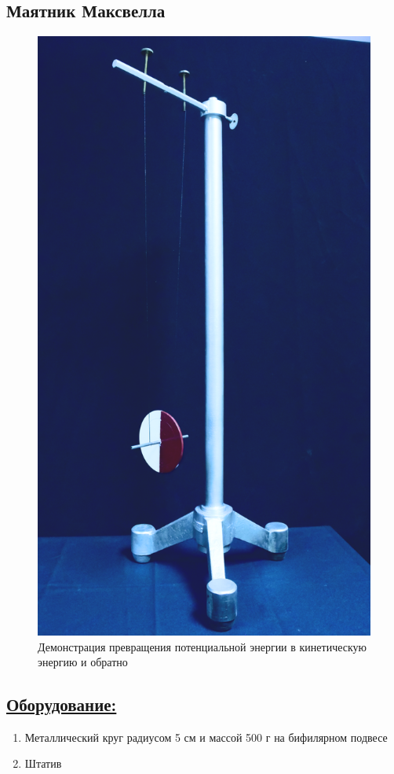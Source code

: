 \documentclass[14pt,a4paper,oneside]{extarticle}	%
\begin{document}
	
	
	\newpage
	\begin{center}
		\subsection*{Маятник Максвелла}
	\end{center}
		

\begin{figure}[H] 	
	\centering 	
	\includegraphics[width=0.5\linewidth]{Maxwell-1.png}
	\caption{Демонстрация превращения потенциальной энергии в кинетическую энергию и обратно}
	\label{Maxwell-1}
\end{figure}
	
	\subsection*{\underline{Оборудование:}}

		\begin{enumerate}
			\item Металлический круг радиусом 5 см и массой 500 г на бифилярном подвесе
			\item Штатив
		\end{enumerate}
	
\end{document}
